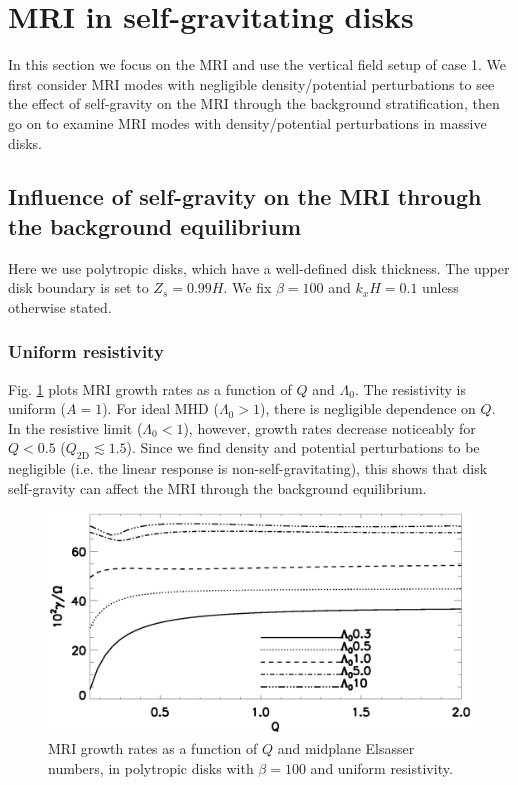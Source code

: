 \section{MRI in self-gravitating disks}\label{result1}
In this section we focus on the MRI and use the vertical field setup
of case 1. We first consider MRI modes with negligible density/potential
perturbations to see the effect of self-gravity on the MRI through the
background stratification, then go on to examine MRI modes with
density/potential perturbations in massive disks.  

\subsection{Influence of self-gravity on the MRI through the
  background equilibrium}
Here we use polytropic disks, which have a well-defined disk
thickness. The upper disk boundary is set to $Z_s=0.99H$. We fix
$\beta=100$ and $k_xH=0.1$ unless otherwise stated. 

\subsubsection{Uniform
  resistivity}   
Fig. \ref{compare_growth_poly_uniresis} plots MRI growth rates as a
function of $Q$ and $\Lambda_0$. The resistivity is uniform ($A=1$). 
For ideal MHD ($\Lambda_0>1$), there is negligible dependence on
$Q$. In the resistive limit   
($\Lambda_0<1$), however, growth rates decrease noticeably for $Q<0.5$
($Q_\mathrm{2D}\lesssim 1.5$).  Since we find density and potential
perturbations to be negligible (i.e. the linear response is
non-self-gravitating), this shows that disk self-gravity can affect the
MRI through the background equilibrium.

\begin{figure}
  \includegraphics[width=\linewidth]{figures/compare_growth_poly_uniresis2}
  \caption{MRI growth rates as a function of $Q$ and midplane 
    Elsasser numbers, in polytropic disks with $\beta=100$ and uniform
    resistivity.  
    \label{compare_growth_poly_uniresis}}
\end{figure}

